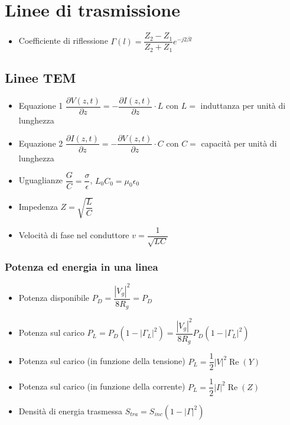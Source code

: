 \documentclass{article}
\begin{document}
\newpage

\section{Linee di trasmissione}
\begin{itemize}
	\item Coefficiente di riflessione \( \Gamma(l) = \dfrac{Z_2 - Z_1}{Z_2 + Z_1} e^{-j 2 \beta l} \)
\end{itemize}

\subsection{Linee TEM}
\begin{itemize}
	\item Equazione 1 \( \dfrac{\partial V(z, t)}{\partial z} = - \dfrac{\partial I(z, t)}{\partial z} \cdot L\) con \(L = \) induttanza per unità di lunghezza
	\item Equazione 2 \( \dfrac{\partial I(z, t)}{\partial z} = - \dfrac{\partial V(z, t)}{\partial z} \cdot C\) con \(C = \) capacità per unità di lunghezza
	\item Uguaglianze \( \dfrac{G}{C} = \dfrac{\sigma}{\epsilon} \), \(L_0 C_0 = \mu_0 \epsilon_0  \)
	\item Impedenza \( Z = \sqrt{\dfrac{L}{C}} \)
	\item Velocità di fase nel conduttore \( v = \dfrac{1}{\sqrt{LC}} \)
\end{itemize}

\subsubsection{Potenza ed energia in una linea}
\begin{itemize}
	\item Potenza disponibile \( P_D = \dfrac{|V_g|^2}{8 R_g} = P_D \)
	\item Potenza sul carico \( P_L = P_D ( 1 - | \Gamma_L | ^ 2 ) = \dfrac{|V_g|^2}{8 R_g} P_D ( 1 - | \Gamma_L | ^ 2 ) \) 
	\item Potenza sul carico (in funzione della tensione) \( P_L = \dfrac{1}{2} |V|^2  \operatorname{Re}(Y) \)
	\item Potenza sul carico (in funzione della corrente) \( P_L = \dfrac{1}{2} |I|^2  \operatorname{Re}(Z) \)
	\item Densità di energia trasmessa \( S_{tra} = S_{inc} \left( 1 - \left|\Gamma \right| ^ 2 \right) \) 
\end{itemize}
\end{document}
